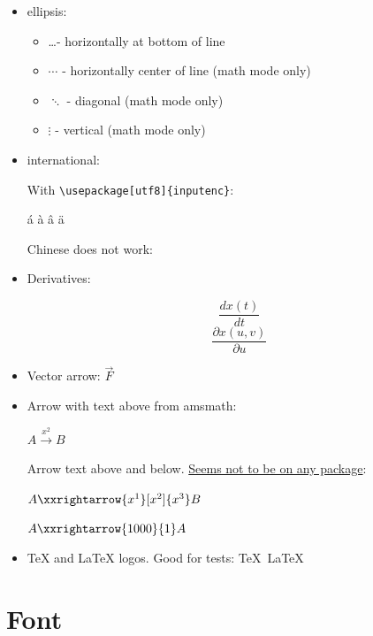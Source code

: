 \documentclass[12pt]{article}
\begin{document}
\begin{itemize}
\item ellipsis:

\begin{itemize}
\item  \ldots   - horizontally at bottom of line
\item  $\cdots$ - horizontally center of line (math mode only)
\item  $\ddots$ - diagonal (math mode only)
\item  $\vdots$ - vertical (math mode only)
\end{itemize}

\item international:

With \lstinline|\usepackage[utf8]{inputenc}|:

á à â ä

Chinese does not work: %

\item Derivatives:

$$ \frac{dx(t)}{dt} $$
$$ \frac{\partial x(u,v)}{\partial u} $$

\item Vector arrow: $\vec{F}$

\item Arrow with text above from amsmath:

$A\xrightarrow{x^2}B$

Arrow text above and below. \href{http://tex.stackexchange.com/questions/27545/custom-length-arrows-text-over-and-under}{Seems not to be on any package}:

$A\xxrightarrow{x^1}[x^2]{x^3}B$

$A\xxrightarrow{1000}{1}A$

\item TeX and LaTeX logos. Good for tests: \TeX\ \LaTeX
\end{itemize}

\section{Font}\label{font}
\end{document}
